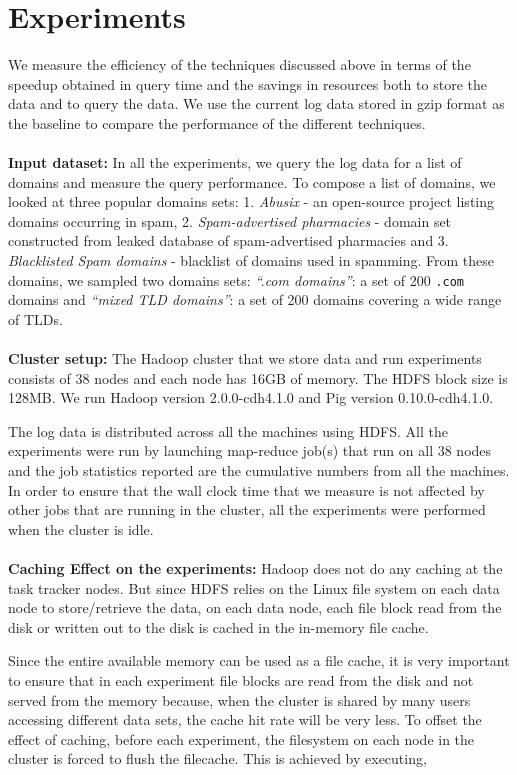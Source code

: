\documentclass[11pt,a4paper]{article}
\begin{document}
\section {Experiments}
We measure the efficiency of the techniques discussed above in terms of the speedup obtained in query time and the savings in resources both to store the data and to query the data. We use the current log data stored in gzip format as the baseline to compare the performance of the different techniques.
\\\\
\textbf{Input dataset:} In all the experiments, we query the log data for a list of domains and measure the query performance. To compose a list of domains, we looked at three popular domains sets: 1. \textit{Abusix}\cite{abusix} - an open-source project listing domains occurring in spam, 2. \textit{Spam-advertised pharmacies}\cite{pharmaleaks} - domain set constructed from leaked database of spam-advertised pharmacies and 3. \textit{Blacklisted Spam domains}\cite{spooky} - blacklist of domains used in spamming.
From these domains, we sampled two domains sets: \textit{``.com domains''}: a set of 200 \texttt{.com} domains and \textit{``mixed TLD domains''}: a set of 200 domains covering a wide range of TLDs.
\\\\
\textbf{Cluster setup:} The Hadoop cluster that we store data and run experiments consists of 38 nodes and each node has 16GB of memory. The HDFS block size is 128MB. We run Hadoop version 2.0.0-cdh4.1.0 and Pig version 0.10.0-cdh4.1.0.

The log data is distributed across all the machines using HDFS. All the experiments were run by launching map-reduce job(s) that run on all 38 nodes and the job statistics reported are the cumulative numbers from all the machines. In order to ensure that the wall clock time that we measure is not affected by other jobs that are running in the cluster, all the experiments were performed when the cluster is idle.
\\\\
\textbf{Caching Effect on the experiments:} Hadoop does not do any caching at the task tracker nodes. But since HDFS relies on the Linux file system on each data node to store/retrieve the data, on each data node, each file block read from the disk or written out to the disk is cached in the in-memory file cache. 

Since the entire available memory can be used as a file cache, it is very important to ensure that in each experiment file blocks are read from the disk and not served from the memory because, when the cluster is shared by many users accessing different data sets, the cache hit rate will be very less. To offset the effect of caching, before each experiment, the filesystem on each node in the cluster is forced to flush the filecache. This is achieved by executing,
\end{document}
